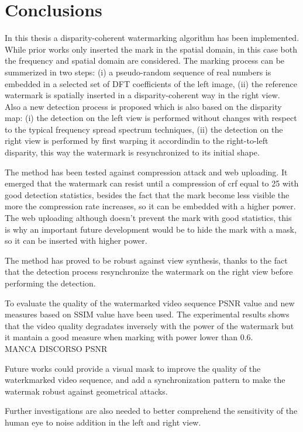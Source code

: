 \chapter{Conclusions}
\label{concl}

In this thesis a disparity-coherent watermarking algorithm has been implemented. While prior works only inserted the mark in the spatial domain, in this case both the frequency and spatial domain are considered. The marking process can be summerized in two steps: (i) a pseudo-random sequence of real numbers is embedded in a selected set of DFT coefficients of the left image, (ii) the reference watermark is spatially inserted in a disparity-coherent way in the right view.\\ 
Also a new detection process is proposed which is also based on the disparity map: (i) the detection on the left view is performed without changes with respect to the typical frequency spread spectrum techniques, (ii) the detection on the right view is performed by first warping it accordindin to the right-to-left disparity, this way the watermark is resynchronized to its initial shape.
 
The method has been tested against compression attack and web uploading. It emerged that the watermark can resist until a compression of crf equal to 25 with good detection statistics, besides the fact that the mark become less visible the more the compression rate increases, so it can be embedded with a higher power.\\
The web uploading although doesn't prevent the mark with good statistics, this is why an important future development would be to hide the mark with a mask, so it can be inserted with higher power.

The method has proved to be robust against view synthesis, thanks to the fact that the detection process resynchronize the watermark on the right view before performing the detection.

To evaluate the quality of the watermarked video sequence PSNR value and new measures based on SSIM value have been used. The experimental results shows that the video quality degradates inversely with the power of the watermark but it mantain a good measure when marking with power lower than 0.6.\\
MANCA DISCORSO PSNR

Future works could provide a visual mask to improve the quality of the waterkmarked video sequence, and add a synchronization pattern to make the watermak robust against geometrical attacks. 

Further investigations are also needed to better comprehend the sensitivity of the human eye to noise addition in the left and right view.



